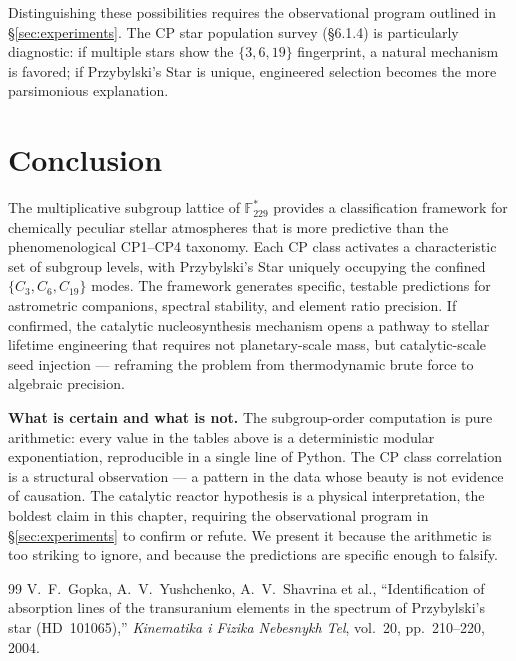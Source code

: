 Distinguishing these possibilities requires the observational program outlined
in \S\ref{sec:experiments}. The CP star population survey (\S6.1.4) is
particularly diagnostic: if multiple stars show the $\{3, 6, 19\}$ fingerprint,
a natural mechanism is favored; if Przybylski's Star is unique, engineered
selection becomes the more parsimonious explanation.


\section{Conclusion}

The multiplicative subgroup lattice of $\mathbb{F}_{229}^*$ provides a
classification framework for chemically peculiar stellar atmospheres that
is more predictive than the phenomenological CP1--CP4 taxonomy. Each CP class
activates a characteristic set of subgroup levels, with Przybylski's Star
uniquely occupying the confined $\{C_3, C_6, C_{19}\}$ modes. The framework
generates specific, testable predictions for astrometric companions, spectral
stability, and element ratio precision. If confirmed, the catalytic
nucleosynthesis mechanism opens a pathway to stellar lifetime engineering
that requires not planetary-scale mass, but catalytic-scale seed injection ---
reframing the problem from thermodynamic brute force to algebraic precision.

\vspace{1em}
\noindent\textbf{What is certain and what is not.}
The subgroup-order computation is pure arithmetic: every value in the tables above is a deterministic modular exponentiation, reproducible in a single line of Python. The CP class correlation is a structural observation --- a pattern in the data whose beauty is not evidence of causation. The catalytic reactor hypothesis is a physical interpretation, the boldest claim in this chapter, requiring the observational program in \S\ref{sec:experiments} to confirm or refute. We present it because the arithmetic is too striking to ignore, and because the predictions are specific enough to falsify.
\newline


\vspace{2em}
\begin{thebibliography}{99}
V.~F.~Gopka, A.~V.~Yushchenko, A.~V.~Shavrina et al.,
``Identification of absorption lines of the transuranium elements in the spectrum of Przybylski's star (HD~101065),''
\emph{Kinematika i Fizika Nebesnykh Tel}, vol.~20, pp.~210--220, 2004.

\end{thebibliography}
